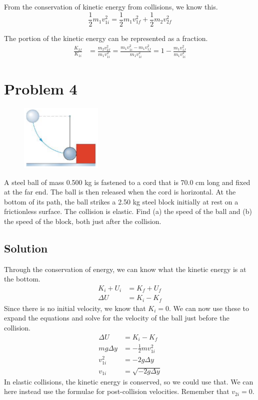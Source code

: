 \documentclass[12pt]{article}
\begin{document}
From the conservation of kinetic energy from collisions, we know this.
\begin{equation}
    \frac{1}{2}m_1v_{1i}^2 = \frac{1}{2}m_1v_{1f}^2 + \frac{1}{2}m_2v_{2f}^2
\end{equation}

The portion of the kinetic energy can be represented as a fraction.
\begin{align}
    \frac{K_{2f}}{K_{1i}}   &=  \frac{m_2v_{2f}^2}{m_1v_{1i}^2}
        =   \frac{m_1v_{1i}^2 - m_1v_{1f}^2}{m_1v_{1i}^2}
        =   1 - \frac{m_1v_{1f}^2}{m_1v_{1i}^2}
\end{align}


\pagebreak
\section*{Problem 4}
\begin{figure}
    \vspace{-30pt}
    \includegraphics[width=0.35\textwidth]{graph_4.png} 
\end{figure}
A steel ball of mass 0.500 kg is fastened to a cord that is 70.0 cm long and fixed at the far end. The
ball is then released when the cord is horizontal. At the bottom of its path, the ball strikes a 2.50 kg steel
block initially at rest on a frictionless surface. The collision is elastic. Find (a) the speed of the ball and
(b) the speed of the block, both just after the collision.

\subsection*{Solution}
Through the conservation of energy, we can know what the kinetic energy is at the bottom.
\begin{align*}
    K_i + U_i &= K_f + U_f\\
    \Delta U &= K_i - K_f
\end{align*}
Since there is no initial velocity, we know that $K_i = 0$. We can now use these to expand the equations and solve for the velocity  of the ball just before the collision.
\begin{align*}
    \Delta U &= K_i - K_f\\
    mg\Delta y  &=  -\frac{1}{2}mv_{1i}^2\\
    v_{1i}^2 &=  -2g\Delta y\\
    v_{1i}   &=  \sqrt{-2g\Delta y}
\end{align*}
In elastic collisions, the kinetic energy is conserved, so we could use that. We can here instead use the formulae for post-collision velocities. Remember that $v_{2i} = 0$.
\end{document}
